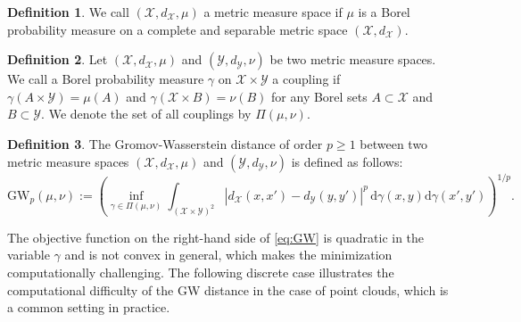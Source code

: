 \documentclass[11pt,letterpaper]{article}
\theoremstyle{definition}
\newtheorem{definition}{Definition}
\numberwithin{equation}{section}
\newcommand{\cX}{\mathcal{X}}
\newcommand{\cY}{\mathcal{Y}}
\begin{document}
\begin{definition}
    We call $(\cX, d_\cX, \mu)$ a metric measure space if $\mu$ is a Borel probability measure on a complete and separable metric space $(\cX, d_\cX)$.
\end{definition}

\begin{definition}
    Let $(\cX, d_\cX, \mu)$ and $(\cY, d_\cY, \nu)$ be two metric measure spaces. We call a Borel probability measure $\gamma$ on $\cX \times \cY$ a coupling if $\gamma(A \times \cY) = \mu(A)$ and $\gamma(\cX \times B) = \nu(B)$ for any Borel sets $A \subset \cX$ and $B \subset \cY$. We denote the set of all couplings by $\Pi(\mu, \nu)$.
\end{definition}

\begin{definition}
    The Gromov-Wasserstein distance of order $p \ge 1$ between two metric measure spaces $(\cX, d_\cX, \mu)$ and $(\cY, d_\cY, \nu)$ is defined as follows:
    \begin{equation}
        \label{eq:GW}
        \mathrm{GW}_p(\mu, \nu) := \left(\inf_{\gamma \in \Pi(\mu, \nu)} \int_{(\cX \times \cY)^2} |d_\cX(x, x') - d_\cY(y, y')|^p \, \mathrm{d} \gamma(x, y) \mathrm{d} \gamma(x', y')\right)^{1 / p}.
    \end{equation}
\end{definition}

The objective function on the right-hand side of \eqref{eq:GW} is quadratic in the variable $\gamma$ and is not convex in general, which makes the minimization computationally challenging. The following discrete case illustrates the computational difficulty of the GW distance in the case of point clouds, which is a common setting in practice.
\end{document}
